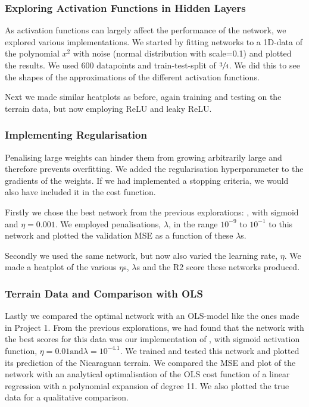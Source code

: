     \subsubsection{Exploring Activation Functions in Hidden Layers}
        As activation functions can largely affect the performance of the network, we explored various implementations. We started by fitting networks to a 1D-data of the polynomial $x^2$ with noise (normal distribution with scale=0.1) and plotted the results. We used 600 datapoints and train-test-split of $\sfrac{3}{4}$. We did this to see the shapes of the approximations of the different activation functions. 
        
        Next we made similar heatplots as before, again training and testing on the terrain data, but now employing ReLU and leaky ReLU. 

    \subsubsection{Implementing Regularisation}
        Penalising large weights can hinder them from growing arbitrarily large and therefore prevents overfitting. We added the regularisation hyperparameter to the gradients of the weights. If we had implemented a stopping criteria, we would also have included it in the cost function. 

        Firstly we chose the best network from the previous explorations: , with sigmoid and $\eta = 0.001$. We employed penalisations, $\lambda$, in the range $10^{-9}$ to $10^{-1}$ to this network and plotted the validation MSE as a function of these $\lambda$s.
        
        Secondly we used the same network, but now also varied the learning rate, $\eta$. We made a heatplot of the various $\eta$s, $\lambda$s and the R2 score these networks produced. 

    \subsubsection{Terrain Data and Comparison with OLS}
        Lastly we compared the optimal network with an OLS-model like the ones made in Project 1. From the previous explorations, we had found that the network with the best scores for this data was our implementation of , with sigmoid activation function, $\eta = 0.01 \text{and} \lambda=10^{-4.1}$. We trained and tested this network and plotted its prediction of the Nicaraguan terrain. We compared the MSE and plot of the network with an analytical optimalisation of the OLS cost function of a linear regression with a polynomial expansion of degree 11. We also plotted the true data for a qualitative comparison.      
    
